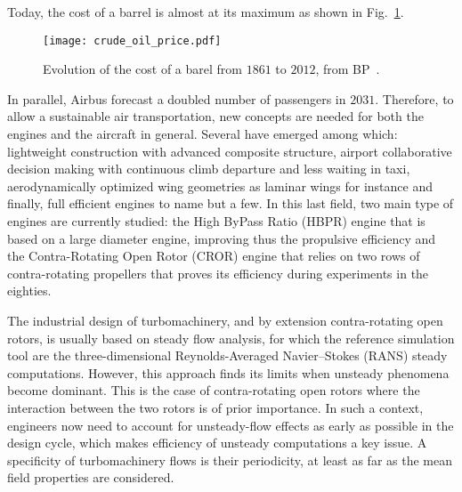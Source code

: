 Today, the cost of a barrel is almost at its maximum as shown
in Fig.~\ref{fig:crude_oil_price}.
\begin{figure}[htp]
  \centering
  \texttt{[image: crude\_oil\_price.pdf]}
  \caption{Evolution of the cost of a barel from $1861$ to $2012$, from BP~\cite{bpreview2013}.}
  \label{fig:crude_oil_price}
\end{figure}
In parallel, Airbus forecast a doubled number of passengers in
$2031$. Therefore, to allow a sustainable air transportation, new
concepts are needed for both the engines and the 
aircraft in general.
Several have emerged among which: lightweight construction
with advanced composite structure, airport collaborative decision
making with continuous climb departure and less waiting in taxi,
aerodynamically optimized wing geometries as laminar wings for instance
and finally, full efficient engines to name but a few.
In this last field, two main type of engines are currently studied: the
High ByPass Ratio (HBPR) engine that is based on a
large diameter engine, improving thus the
propulsive efficiency and the Contra-Rotating Open Rotor (CROR)
engine that relies on two rows of contra-rotating propellers
that proves its efficiency during experiments in the
eighties.


The industrial design of turbomachinery, and by extension contra-rotating
open rotors, is usually based on steady flow analysis, 
for which the reference simulation tool are the three-dimensio\-nal Reynolds-Averaged 
Navier--Stokes (RANS) steady computations. However, this approach finds its limits 
when unsteady phenomena become dominant. This is the case of 
contra-rotating open rotors where the interaction between the
two rotors is of prior importance.
In such a context, engineers now 
need to account for unsteady-flow effects as early as possible in the design 
cycle, which makes efficiency of unsteady computations a key issue. 
A specificity of turbomachinery flows is their periodicity, 
at least as far as the mean field properties are considered. 

